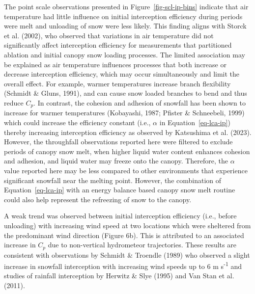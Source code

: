 \documentclass[
  letterpaper,
  DIV=11,
  numbers=noendperiod]{scrartcl}
\begin{document}
The point scale observations presented in Figure~\ref{fig-scl-ip-bins}
indicate that air temperature had little influence on initial
interception efficiency during periods were melt and unloading of snow
were less likely. This finding aligns with Storck et al. (2002), who
observed that variations in air temperature did not significantly affect
interception efficiency for measurements that partitioned ablation and
initial canopy snow loading processes. The limited association may be
explained as air temperature influences processes that both increase or
decrease interception efficiency, which may occur simultaneously and
limit the overall effect. For example, warmer temperatures increase
branch flexibility (Schmidt \& Gluns, 1991), and can cause snow loaded
branches to bend and thus reduce \(C_p\). In contrast, the cohesion and
adhesion of snowfall has been shown to increase for warmer temperatures
(Kobayashi, 1987; Pfister \& Schneebeli, 1999) which could increase the
efficiency constant (i.e., \(\alpha\) in Equation~\ref{eq-lca-ip})
thereby increasing interception efficiency as observed by Katsushima et
al. (2023). However, the throughfall observations reported here were
filtered to exclude periods of canopy snow melt, when higher liquid
water content enhances cohesion and adhesion, and liquid water may
freeze onto the canopy. Therefore, the \(\alpha\) value reported here
may be less compared to other environments that experience significant
snowfall near the melting point. However, the combination of
Equation~\ref{eq-lca-ip} with an energy balance based canopy snow melt
routine could also help represent the refreezing of snow to the canopy.

A weak trend was observed between initial interception efficiency (i.e.,
before unloading) with increasing wind speed at two locations which were
sheltered from the predominant wind direction (Figure 6b). This is
attributed to an associated increase in \(C_p\) due to non-vertical
hydrometeor trajectories. These results are consistent with observations
by Schmidt \& Troendle (1989) who observed a slight increase in snowfall
interception with increasing wind speeds up to 6 m s\textsuperscript{-1}
and studies of rainfall interception by Herwitz \& Slye (1995) and Van
Stan et al. (2011).
\end{document}
